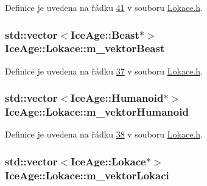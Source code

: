 Definice je uvedena na řádku \hyperlink{Lokace_8h_source_l00041}{41} v souboru \hyperlink{Lokace_8h_source}{Lokace.\+h}.

\subsubsection[{\texorpdfstring{m\+\_\+vektor\+Beast}{m_vektorBeast}}]{\setlength{\rightskip}{0pt plus 5cm}std\+::vector$<${\bf Ice\+Age\+::\+Beast}$\ast$$>$ Ice\+Age\+::\+Lokace\+::m\+\_\+vektor\+Beast\hspace{0.3cm}{\ttfamily [private]}}\hypertarget{classIceAge_1_1Lokace_a5dcb719c38dae7d7600a868bc40a0380}{}\label{classIceAge_1_1Lokace_a5dcb719c38dae7d7600a868bc40a0380}


Definice je uvedena na řádku \hyperlink{Lokace_8h_source_l00037}{37} v souboru \hyperlink{Lokace_8h_source}{Lokace.\+h}.

\subsubsection[{\texorpdfstring{m\+\_\+vektor\+Humanoid}{m_vektorHumanoid}}]{\setlength{\rightskip}{0pt plus 5cm}std\+::vector$<${\bf Ice\+Age\+::\+Humanoid}$\ast$$>$ Ice\+Age\+::\+Lokace\+::m\+\_\+vektor\+Humanoid\hspace{0.3cm}{\ttfamily [private]}}\hypertarget{classIceAge_1_1Lokace_a777a6a3ae16e84b9843b9b18912014d2}{}\label{classIceAge_1_1Lokace_a777a6a3ae16e84b9843b9b18912014d2}


Definice je uvedena na řádku \hyperlink{Lokace_8h_source_l00038}{38} v souboru \hyperlink{Lokace_8h_source}{Lokace.\+h}.

\subsubsection[{\texorpdfstring{m\+\_\+vektor\+Lokaci}{m_vektorLokaci}}]{\setlength{\rightskip}{0pt plus 5cm}std\+::vector$<${\bf Ice\+Age\+::\+Lokace}$\ast$$>$ Ice\+Age\+::\+Lokace\+::m\+\_\+vektor\+Lokaci\hspace{0.3cm}{\ttfamily [private]}}\hypertarget{classIceAge_1_1Lokace_aa436a7cc7b4878f7c099f17b8874c852}{}\label{classIceAge_1_1Lokace_aa436a7cc7b4878f7c099f17b8874c852}



